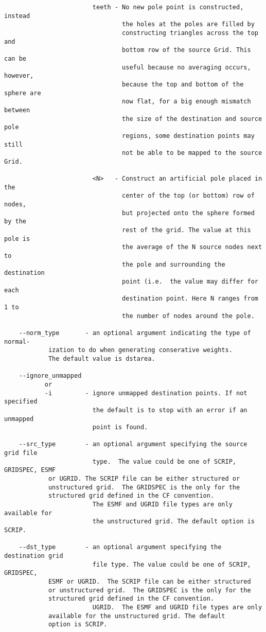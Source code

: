 \begin{verbatim}
                        teeth - No new pole point is constructed, instead
                                the holes at the poles are filled by
                                constructing triangles across the top and
                                bottom row of the source Grid. This can be
                                useful because no averaging occurs, however,
                                because the top and bottom of the sphere are
                                now flat, for a big enough mismatch between
                                the size of the destination and source pole
                                regions, some destination points may still
                                not be able to be mapped to the source Grid.

                        <N>   - Construct an artificial pole placed in the
                                center of the top (or bottom) row of nodes,
                                but projected onto the sphere formed by the
                                rest of the grid. The value at this pole is
                                the average of the N source nodes next to
                                the pole and surrounding the destination
                                point (i.e.  the value may differ for each
                                destination point. Here N ranges from 1 to
                                the number of nodes around the pole.

    --norm_type       - an optional argument indicating the type of normal-
			ization to do when generating conserative weights. 
			The default value is dstarea.

    --ignore_unmapped
           or
           -i         - ignore unmapped destination points. If not specified
                        the default is to stop with an error if an unmapped
                        point is found.

    --src_type        - an optional argument specifying the source grid file
                        type.  The value could be one of SCRIP, GRIDSPEC, ESMF
			or UGRID. The SCRIP file can be either structured or
 			unstructured grid.  The GRIDSPEC is the only for the
			structured grid defined in the CF convention.
                        The ESMF and UGRID file types are only available for
                        the unstructured grid. The default option is SCRIP.

    --dst_type        - an optional argument specifying the destination grid
                        file type. The value could be one of SCRIP, GRIDSPEC,
			ESMF or UGRID.  The SCRIP file can be either structured
 			or unstructured grid.  The GRIDSPEC is the only for the
			structured grid defined in the CF convention.
                        UGRID.  The ESMF and UGRID file types are only
			available for the unstructured grid. The default
			option is SCRIP.


\end{verbatim}
